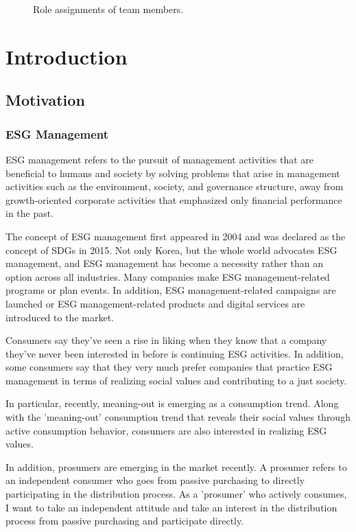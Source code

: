 \documentclass[conference]{IEEEtran}
\begin{document}
\begin{figure}[h!]
\caption{Role assignments of team members.}
\label{fig}
\end{figure}

\section{Introduction}

\subsection{Motivation}\label{AA}
\subsubsection{ESG Management}
ESG management refers to the pursuit of management activities that are beneficial to humans and society by solving problems that arise in management activities such as the environment, society, and governance structure, away from growth-oriented corporate activities that emphasized only financial performance in the past.

The concept of ESG management first appeared in 2004 and was declared as the concept of SDGs in 2015. Not only Korea, but the whole world advocates ESG management, and ESG management has become a necessity rather than an option across all industries. Many companies make ESG management-related programs or plan events. In addition, ESG management-related campaigns are launched or ESG management-related products and digital services are introduced to the market.

Consumers say they've seen a rise in liking when they know that a company they've never been interested in before is continuing ESG activities. In addition, some consumers say that they very much prefer companies that practice ESG management in terms of realizing social values and contributing to a just society.

In particular, recently, meaning-out is emerging as a consumption trend. Along with the 'meaning-out' consumption trend that reveals their social values through active consumption behavior, consumers are also interested in realizing ESG values.

In addition, prosumers are emerging in the market recently. A prosumer refers to an independent consumer who goes from passive purchasing to directly participating in the distribution process. As a 'prosumer' who actively consumes, I want to take an independent attitude and take an interest in the distribution process from passive purchasing and participate directly.
\end{document}
